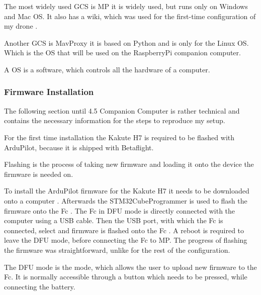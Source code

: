 \documentclass[svgnames]{article}
\begin{document}
	The most widely used \gls{GCS} is \gls{MP} it is widely used, but runs only on Windows and Mac OS. It also has a wiki, which was used for the first-time configuration of my drone \cite{MissionPlanner}. 
	
	Another GCS is MavProxy it is based on Python and is only for the Linux \gls{OS}. Which is the \gls{OS} that will be used on the RaspberryPi companion computer. 
	\begin{Explanation}
		\item A \gls{OS} is a software, which controls all the hardware of a computer.
	\end{Explanation}

	\subsubsection{Firmware Installation}
	The following section until 4.5 Companion Computer is rather technical and contains the necessary information for the steps to reproduce my setup.
	
	For the first time installation the Kakute H7 is required to be flashed with ArduPilot, because it is shipped with Betaflight. 
	\begin{Explanation}[to flash]
		\item Flashing is the process of taking new firmware and loading it onto the device the firmware is needed on.
	\end{Explanation} 
	To install the ArduPilot firmware for the Kakute H7  it needs to be downloaded onto a computer \cite{ArduPilotFirmware}. Afterwards the STM32CubeProgrammer is used to flash the firmware onto the Fc \cite{STM32CubeProgrammer}. The \gls{Fc} in \gls{DFU} mode is directly connected with the computer using a USB cable. Then the USB port, with which the \gls{Fc} is connected, select and firmware is flashed onto the \gls{Fc} . A reboot is required to leave the \gls{DFU} mode, before connecting the \gls{Fc} to \gls{MP}. The progress of flashing the firmware was straightforward, unlike for the rest of the configuration.
	\begin{Explanation}%
		\item The \gls{DFU} mode is the mode, which allows the user to upload new firmware to the \gls{Fc}. It is normally accessible through a button which needs to be pressed, while connecting the battery. 
	\end{Explanation}
\end{document}
